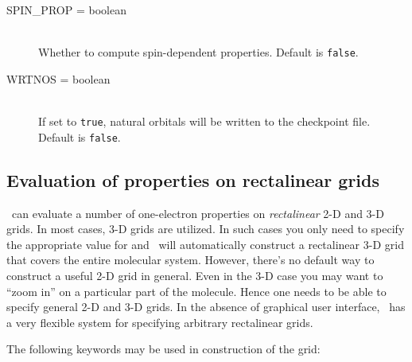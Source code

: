 \begin{description}
\item[SPIN\_PROP = boolean]\mbox{}\\
Whether to compute spin-dependent properties.
Default is {\tt false}.

\item[WRTNOS = boolean]\mbox{}\\
If set to {\tt true},
natural orbitals will be written to the checkpoint file.
Default is {\tt false}.

\end{description}


\subsection{Evaluation of properties on rectalinear grids}
\PSIthree\ can evaluate a number of one-electron properties
on {\em rectalinear} 2-D and 3-D grids. In most cases,
3-D grids are utilized. In such cases you only need
to specify the appropriate value for 
and \PSIthree\ will automatically construct a rectalinear
3-D grid that covers the entire molecular system.
However, there's no default way to construct a useful 2-D
grid in general. Even in the 3-D case you may want to
``zoom in'' on a particular part of the molecule.
Hence one needs to be able to specify general 2-D
and 3-D grids. In the absence of graphical user interface,
\PSIthree\ has a very flexible system for specifying
arbitrary rectalinear grids.

The following keywords may be used in construction of
the grid:

